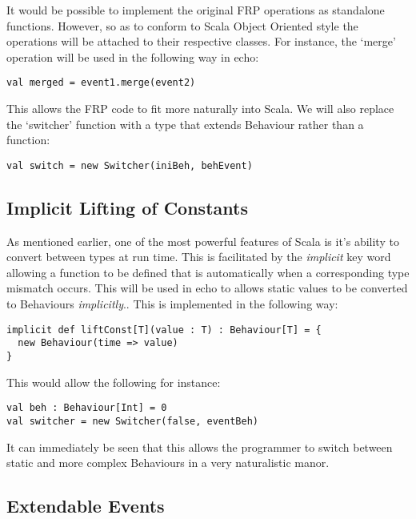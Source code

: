       It would be possible to implement the original FRP operations as standalone functions. However, so
      as to conform to Scala Object Oriented style the operations will be attached to their respective
      classes. For instance, the `merge' operation will be used in the following way in echo:
      
\begin{verbatim}
val merged = event1.merge(event2)
\end{verbatim}

    This allows the FRP code to fit more naturally into Scala. We will also replace the `switcher' function
    with a type that extends Behaviour rather than a function:
    
\begin{verbatim}
val switch = new Switcher(iniBeh, behEvent)
\end{verbatim}

    \subsection{Implicit Lifting of Constants}
      As mentioned earlier, one of the most powerful features of Scala is it's ability to convert between
      types at run time. This is facilitated by the \emph{implicit} key word allowing a function to be defined
      that is automatically when a corresponding type mismatch occurs. This will be used in echo to allows 
      static values to be converted to Behaviours \emph{implicitly}.. This is implemented in the following way:  

\begin{verbatim}
implicit def liftConst[T](value : T) : Behaviour[T] = {
  new Behaviour(time => value)
}
\end{verbatim}              
      
      This would allow the following for instance:

\begin{verbatim}
val beh : Behaviour[Int] = 0
val switcher = new Switcher(false, eventBeh)
\end{verbatim}       

      It can immediately be seen that this allows the programmer to switch between static and more complex
      Behaviours in a very naturalistic manor.
      
    \subsection{Extendable Events}
    
